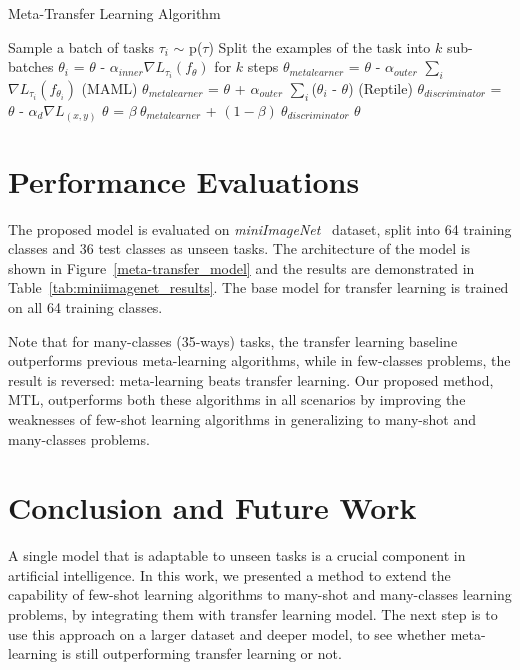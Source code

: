 \documentclass[letterpaper]{article}
\begin{document}
\begin{algorithm}
\caption{Meta-Transfer Learning Algorithm}\label{basic}
\begin{algorithmic}[1]
        \State Sample a batch of tasks $\tau_i$ $\sim$ p($\tau$)
        \State Split the examples of the task into $k$ sub-batches
        \State $\theta_i$ = $\theta$ - $\alpha_{inner} \nabla L_{\tau_i}(f_\theta)$ for $k$ steps
        \EndFor
        \State $\theta_{metalearner}$ = $\theta$ - $\alpha_{outer}$ $\sum_{i}$ $\nabla L_{\tau_i}(f_{\theta_i})$ (MAML)
        \State $\theta_{metalearner}$ = $\theta$ + $\alpha_{outer}$ $\sum_{i}$($\theta_i$ - $\theta$) (Reptile)
        \State $\theta_{discriminator}$ = $\theta$ - $\alpha_{d} \nabla L_{(x,y)}$
        \State $\theta$ = $\beta~\theta_{metalearner}$ + $(1-\beta)~\theta_{discriminator}$
      \EndFor
	\State \Return $\theta$
\end{algorithmic}
\end{algorithm}

\section{Performance Evaluations}
The proposed model is evaluated on \textit{miniImageNet}~\cite{MatchingNetwork} dataset, split into 64 training classes and 36 test classes as unseen tasks. The architecture of the model is shown in Figure~\ref{meta-transfer_model} and the results are demonstrated in Table~\ref{tab:miniimagenet_results}. The base model for transfer learning is trained on all 64 training classes.

Note that for many-classes (35-ways) tasks, the transfer learning baseline outperforms previous meta-learning algorithms, while in few-classes problems, the result is reversed: meta-learning beats transfer learning. Our proposed method, MTL, outperforms both these algorithms in all scenarios by improving the weaknesses of few-shot learning algorithms in generalizing to many-shot and many-classes problems.

\section{Conclusion and Future Work}
A single model that is adaptable to unseen tasks is a crucial component in artificial intelligence. In this work, we presented a method to extend the capability of few-shot learning algorithms to many-shot and many-classes learning problems, by integrating them with transfer learning model. The next step is to use this approach on a larger dataset and deeper model, to see whether meta-learning is still outperforming transfer learning or not.
\end{document}

